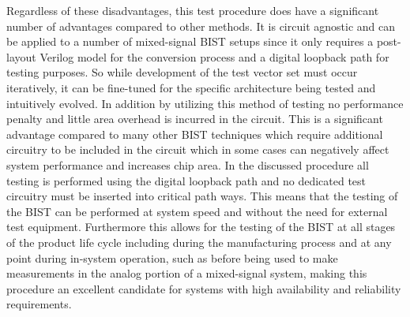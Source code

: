 \documentclass[12pt]{report}
\begin{document}
Regardless of these disadvantages, this test procedure does have a significant number of advantages compared to other methods.  It is circuit agnostic and can be applied to a number of mixed-signal BIST setups since it only requires a post-layout Verilog model for the conversion process and a digital loopback path for testing purposes.  So while development of the test vector set must occur iteratively, it can be fine-tuned for the specific architecture being tested and intuitively evolved.  In addition by utilizing this method of testing no performance penalty and little area overhead is incurred in the circuit.  This is a significant advantage compared to many other BIST techniques which require additional circuitry to be included in the circuit which in some cases can negatively affect system performance and increases chip area.  In the discussed procedure all testing is performed using the digital loopback path and no dedicated test circuitry must be inserted into critical path ways.  This means that the testing of the BIST can be performed at system speed and without the need for external test equipment.  Furthermore this allows for the testing of the BIST at all stages of the product life cycle including during the manufacturing process and at any point during in-system operation, such as before being used to make measurements in the analog portion of a mixed-signal system, making this procedure an excellent candidate for systems with high availability and reliability requirements.
\end{document}
